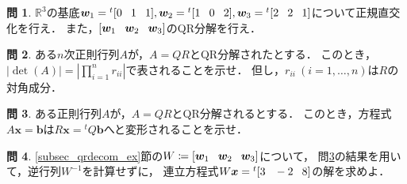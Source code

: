 \documentclass[dvipdfmx]{jsarticle}
\theoremstyle{definition}
\newtheorem{question}{問}[section]
\newcommand{\tp}[1]{{}^{t}#1}
\newcommand{\hs}[1]{\hspace{#1em}}
\newcommand{\hv}[3]{[#1 \hs{0.8} #2 \hs{0.8} #3]}
\newcommand{\tpv}[3]{\tp{[#1 \hs{0.8} #2 \hs{0.8} #3]}}
\begin{document}
\begin{question}
    \label{q_numex}
    $\mathbb{R}^3$の基底$\bm{w}_1 = \tpv{0}{1}{1}, \bm{w}_2 = \tpv{1}{0}{2}, \bm{w}_3 = \tpv{2}{2}{1}$について正規直交化を行え．
    また，$\hv{\bm{w}_1}{\bm{w}_2}{\bm{w}_3}$のQR分解を行え．
\end{question}
\begin{comment}
    答\ref{q_numex}：
    \begin{align*}
        \begin{bmatrix}
            0 & 1 & 1 \\
            1 & 0 & 2 \\
            1 & 2 & 1
        \end{bmatrix}
        = \begin{bmatrix}
            0 & 1/\sqrt{3} & 2/\sqrt{6} \\
            1/\sqrt{2} & -1/\sqrt{3} & 1/\sqrt{6} \\
            1/\sqrt{2} & 1/\sqrt{3} & -1/\sqrt{6}
        \end{bmatrix}
        \begin{bmatrix}
            \sqrt{2} & \sqrt{2} & 3\sqrt{2}/2 \\
            0 & \sqrt{3} & \sqrt{3}/3 \\
            0 & 0 & 5\sqrt{6}/6
        \end{bmatrix}
    \end{align*}
\end{comment}

\begin{question}
    \label{q_qrdecom_det}
    ある$n$次正則行列$A$が，$A = QR$とQR分解されたとする．
    このとき，$\displaystyle \left| \det(A) \right| = \left| \prod_{i = 1}^{n} r_{ii} \right|$で表されることを示せ．
    但し，$r_{ii} \ ( i = 1, \ldots, n)$は$R$の対角成分．
\end{question}

\begin{question}
    \label{q_qr_eq_solve}
    ある正則行列$A$が，$A = QR$とQR分解されるとする．
    このとき，方程式$A \bm{x} = \bm{b}$は$R \bm{x} = \tp{Q}\bm{b}$へと変形されることを示せ．
\end{question}

\begin{question}
    \label{q_qr_eq_solve_ex}
    \ref{subsec_qrdecom_ex}節の$W \coloneqq \hv{\bm{w}_1}{\bm{w}_2}{\bm{w}_3}$について，
    問\ref{q_qr_eq_solve}の結果を用いて，逆行列$W^{-1}$を計算せずに，
    連立方程式$W\bm{x} = \tpv{3}{-2}{8}$の解を求めよ．
\end{question}
\begin{comment}
    答\ref{q_qr_eq_solve_ex}：
    $W$は正則より，$W = QR$のようにQR分解される．
    また，問\ref{q_qr_eq_solve}より，連立方程式は$R\bm{x} = \tp{Q}\bm{b}$と変形される．
    このとき，$R$は上三角行列より，$x_3$から順に解いていけば良く，$\bm{x} = \tpv{5}{-2}{3}$．
\end{comment}
\end{document}
